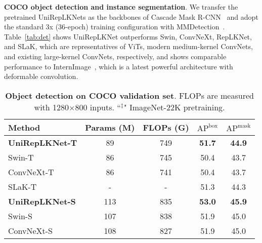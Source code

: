 \documentclass[10pt,twocolumn,letterpaper]{article}
\begin{document}
\noindent\textbf{COCO object detection and instance segmentation}. We transfer the pretrained UniRepLKNets as the backbones of Cascade Mask R-CNN~\cite{he2017mask,cai2019cascade} and adopt the standard 3x (36-epoch) training configuration with MMDetection~\cite{mmdetection}. Table~\ref{tab:det} shows UniRepLKNet outperforms Swin, ConvNeXt, RepLKNet, and SLaK, which are representatives of ViTs, modern medium-kernel ConvNets, and existing large-kernel ConvNets, respectively, and shows comparable performance to InternImage~\cite{wang2023internimage}, which is a latest powerful architecture with deformable convolution.

\begin{table}[t]
        \centering
    \renewcommand\arraystretch{0.89}
    \setlength{\tabcolsep}{0.9mm}
    \footnotesize
    \caption{\textbf{Object detection on COCO validation set}. FLOPs are measured with 1280$\times$800 inputs. ``$^\ddagger$" ImageNet-22K pretraining.}
    \vspace{-0.1in}
    
\begin{tabular}{l|c|c|c|c}
\hline
    Method & Params (M) &  FLOPs (G)  & $\text{AP}^{\text{box}}$  &  $\text{AP}^{\text{mask}}$   \\
    \hline
    \rowcolor{gray!20}
    \textbf{UniRepLKNet-T}   &          89  &   749     &   \textbf{51.7}    &   \textbf{44.9}     \\
    Swin-T~\cite{liu2021swin}      &   86   &   745     &   50.4    &   43.7\\
    ConvNeXt-T~\cite{liu2022convnet}  &   86   &   741      &   50.4    &   43.7\\
    SLaK-T~\cite{liu2022more}      &   -   &   -        &   51.3    &   44.3\\
    
    \hline
    \rowcolor{gray!20}
    \textbf{UniRepLKNet-S}       &   113  &   835    &   \textbf{53.0}      &     \textbf{45.9}      \\ 
    Swin-S~\cite{liu2021swin}      &   107   &   838    &   51.9    &   45.0\\
    ConvNeXt-S~\cite{liu2022convnet}  &   108   &   827     &   51.9    &   45.0\\
    

\end{tabular}
\end{table}
\end{document}
